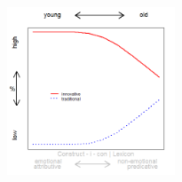 \documentclass[12pt, table]{beamer}
\begin{document}
\begin{frame}
\begin{minipage}[t]{\linewidth}
\begin{minipage}{.45\linewidth}
\begin{tabular}{cccccccccc }
\end{tabular}
\end{minipage}
\hfill
\begin{minipage}{.45\linewidth}
\begin{figure}
\includegraphics[width=5cm]{images/LangChang15.png}
\end{figure}
\end{minipage}
\end{minipage}
\end{frame}
\end{document}
